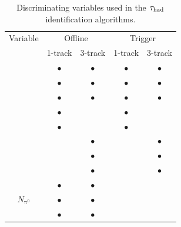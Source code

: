 \begin{table}[htp] 
  \centering
  \begin{tabular}{|c|cc|cc|}
    \hline
    Variable & \multicolumn{2}{c|}{Offline}      & \multicolumn{2}{c|}{Trigger} \\
                         &  1-track  & 3-track   & 1-track   & 3-track   \\ \hline
    \centEnergyFrac{}    & $\bullet$ & $\bullet$ & $\bullet$ & $\bullet$ \\
    \leadTrackMomFrac{}  & $\bullet$ & $\bullet$ & $\bullet$ & $\bullet$ \\
    \trkAvgDist{}        & $\bullet$ & $\bullet$ & $\bullet$ & $\bullet$ \\
    \ipSigLeadTrk{}      & $\bullet$ &           & $\bullet$ &           \\
    \numIsoTrack{}       & $\bullet$ &           & $\bullet$ &           \\
    \dRmax{}             &           & $\bullet$ &           & $\bullet$ \\
    \trkFlightPathSig{}  &           & $\bullet$ &           & $\bullet$ \\
    \massTrkSys{}        &           & $\bullet$ &           & $\bullet$ \\
    \massTrkPizeroSys{}  & $\bullet$ & $\bullet$ &           &           \\
    $N_{\mathrm{\pi^0}}$ & $\bullet$ & $\bullet$ &           &           \\
    \Etratio{}           & $\bullet$ & $\bullet$ &           &           \\
    \hline
  \end{tabular}
  \caption{Discriminating variables used in the $\tau_\text{had}$ identification algorithms.}
  \label{tab:taus-idvars}
\end{table}

